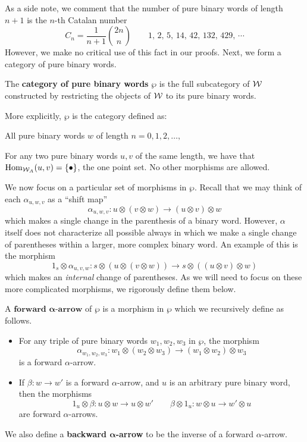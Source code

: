 As a side note, we comment that the number of pure binary words of length $n+1$ is the
$n$-th Catalan number 
\[
    C_{n}=\frac{1}{n+1}{2n \choose n} \qquad 1,\, 2,\, 5,\, 14,\, 42,\, 132,\, 429,\, \cdots
\]
However, we make no critical use of this fact in our proofs.    
Next, we form a category of pure binary words.

\begin{definition}
    The \textbf{category of pure binary words} $\wp$  
    is the full subcategory of $\mathcal{W}$ constructed by restricting 
    the objects of $\mathcal{W}$ to its pure binary words. 

    More explicitly, $\wp$ is the category defined as:
    \begin{description}[leftmargin = -0.2cm]
        \item[Objects.] All pure binary words $w$ of length $n = 0, 1, 2, \dots,$ 
        \item[Morphisms.] For any two pure binary words $u,v$ of the same length, 
        we have that $\operatorname{\mathrm{Hom}}_{\mathcal{W}_A}(u,v) = \{\bullet\}$, the one point set. 
        No other morphisms are allowed.
    \end{description}
\end{definition}

We now focus on a particular set of morphisms in $\wp$. Recall that 
we may think of each $\alpha_{u,w,v}$ as a ``shift map''
\[
    \alpha_{u,w,v}: u \otimes (v\otimes  w) \to (u \otimes v)\otimes w
\]
which makes a single change in the parenthesis of a binary word. 
However, $\alpha$ itself does not characterize all possible always in which we make
a single change of parentheses within a larger, more complex binary word.
An example of this is the morphism
\[
    1_{s}\otimes \alpha_{u,v,w}: s\otimes (u \otimes (v \otimes w))
    \to s \otimes ((u \otimes v)\otimes w)
\]
which makes an \emph{internal} change of parentheses. 
As we will need to focus on these more complicated morphisms, 
we rigorously define them below.

\begin{definition}  
    A $\textbf{forward } \bm{\alpha}\textbf{-arrow}$ of $\wp$ is a morphism in $\wp$ 
    which we recursively define as follows. 
    \begin{itemize}
        \item For any triple of pure binary words $w_1, w_2, w_3$ in $\wp$, 
        the morphism
        \[
            \alpha_{w_1,w_2,w_3}: w_1\otimes (w_2 \otimes w_3) \to (w_1\otimes w_2)\otimes w_3
        \]
        is a forward $\alpha$-arrow. 
           
        \item If $\beta: w \to w'$ is a forward 
        $\alpha$-arrow, and $u$ is an arbitrary pure binary word, 
        then the morphisms 
        \[
            1_{u} \otimes \beta: u \otimes w \to u \otimes w' \qquad 
            \beta \otimes 1_{u}:w \otimes u \to w' \otimes u
        \]
        are forward $\alpha$-arrows. 
    \end{itemize}
    We also define a \textbf{backward $\bm{\alpha}$-arrow} to be the 
    inverse of a forward $\alpha$-arrow.
\end{definition}

